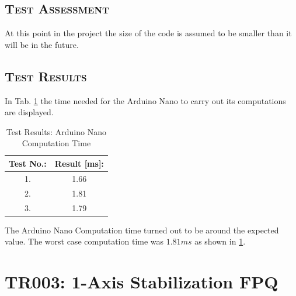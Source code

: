 \subsection*{\textsc{\medium Test Assessment}}
At this point in the project the size of the code is assumed to be smaller than it will be in the future. 

\subsection*{\textsc{\medium Test Results}}
In Tab. \ref{tab:tabt5} the time needed for the Arduino Nano to carry out its computations are displayed.  
\begin {table}[H]
    \begin{center}
    \caption {Test Results: Arduino Nano Computation Time} 
    \label{tab:tabt5} 
    \begin{tabular}{|c|c|}\hline 
        Test No.: &  Result [ms]:\\ \hline
        1. & 1.66 \\ \hline
        2. & 1.81 \\ \hline
        3. & 1.79 \\ \hline
    \end{tabular}
    \end{center}
\end{table}

The Arduino Nano Computation time turned out to be around the expected value. The worst case computation time was $1.81ms$ as shown in \ref{tab:tabt5}. 

\newpage


\section{TR003: 1-Axis Stabilization FPQ}
         {}
                         

